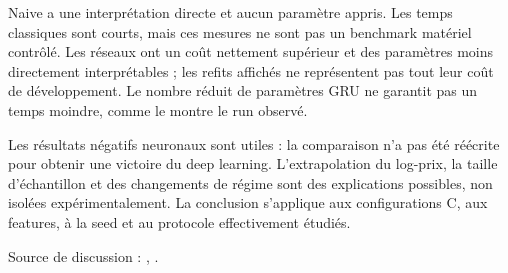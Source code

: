 



Naive a une interprétation directe et aucun paramètre appris. Les temps classiques sont courts, mais ces mesures ne sont pas un benchmark matériel contrôlé. Les réseaux ont un coût nettement supérieur et des paramètres moins directement interprétables ; les refits affichés ne représentent pas tout leur coût de développement. Le nombre réduit de paramètres GRU ne garantit pas un temps moindre, comme le montre le run observé.



Les résultats négatifs neuronaux sont utiles : la comparaison n’a pas été réécrite pour obtenir une victoire du deep learning. L’extrapolation du log-prix, la taille d’échantillon et des changements de régime sont des explications possibles, non isolées expérimentalement. La conclusion s’applique aux configurations C, aux features, à la seed et au protocole effectivement étudiés.



Source de discussion : , .
